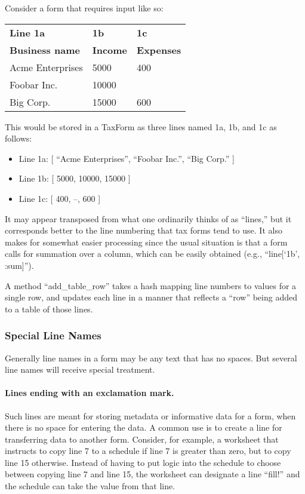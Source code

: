 \documentclass[12pt]{article}
\begin{document}
Consider a form that requires input like so:
\begin{center}
\begin{tabular}{|l|l|l|}
\hline
\textbf{Line 1a} & \textbf{1b} & \textbf{1c} \\
\textbf{Business name} & \textbf{Income} & \textbf{Expenses} \\
\hline
Acme Enterprises & 5000 & 400 \\
\hline
Foobar Inc. & 10000 & \\
\hline
Big Corp. & 15000 & 600 \\
\hline
\end{tabular}
\end{center}
This would be stored in a TaxForm as three lines named 1a, 1b, and 1c as
follows:
\begin{itemize}
\item Line 1a: [ ``Acme Enterprises'', ``Foobar Inc.'', ``Big Corp.'' ]
\item Line 1b: [ 5000, 10000, 15000 ]
\item Line 1c: [ 400, --, 600 ]
\end{itemize}
It may appear transposed from what one ordinarily thinks of as ``lines,'' but it
corresponds better to the line numbering that tax forms tend to use. It also
makes for somewhat easier processing since the usual situation is that a form
calls for summation over a column, which can be easily obtained (e.g.,
``line[`1b', :sum]'').

A method ``add\_table\_row'' takes a hash mapping line numbers to values for a
single row, and updates each line in a manner that reflects a ``row'' being
added to a table of those lines.

\subsubsection{Special Line Names}

Generally line names in a form may be any text that has no spaces. But several
line names will receive special treatment.

\paragraph{Lines ending with an exclamation mark.} Such lines are meant for
storing metadata or informative data for a form, when there is no space for
entering the data. A common use is to create a line for transferring data to
another form. Consider, for example, a worksheet that instructs to copy line 7
to a schedule if line 7 is greater than zero, but to copy line 15 otherwise.
Instead of having to put logic into the schedule to choose between copying line
7 and line 15, the worksheet can designate a line ``fill!\@'' and the schedule
can take the value from that line.
\end{document}
